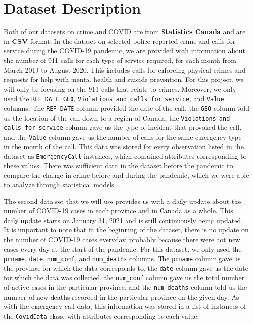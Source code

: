 \documentclass[fontsize=11pt]{article}
\begin{document}
\section{Dataset Description}
Both of our datasets on crime and COVID are from \textbf{Statistics Canada} and are in \textbf{CSV} format. In the dataset on selected police-reported crime and calls for service during the COVID-19 pandemic\cite{crime}, we are provided with information about the number of 911 calls for each type of service required, for each month from March 2019 to August 2020. This includes calls for enforcing physical crimes and requests for help with mental health and suicide prevention. For this project, we will only be focusing on the 911 calls that relate to  crimes. Moreover, we only used the \verb+REF_DATE+, \verb+GEO+, \verb+Violations and calls for service+, and \verb+Value+ columns. The \verb+REF_DATE+ column provided the date of the call, the \verb+GEO+ column told us the location of the call down to a region of Canada, the \verb+Violations and calls for service+ column gave us the type of incident that provoked the call, and the \verb+Value+ column gave us the number of calls for the same emergency type in the month of the call. This data was stored for every observation listed in the dataset as \verb+EmergencyCall+ instances, which contained attributes corresponding to these values. There was sufficient data in the dataset before the pandemic to compare the change in crime before and during the pandemic, which we were able to analyze through statistical models.

The second data set\cite{covid} that we will use provides us with a daily update about the number of COVID-19 cases in each province and in Canada as a whole. This daily update starts on January 31, 2021 and is still continuously being updated. It is important to note that in the beginning of the dataset, there is no update on the number of COVID-19 cases everyday, probably because there were not new cases every day at the start of the pandemic. For this dataset, we only used the \verb+prname+, \verb+date+, \verb+num_conf+, and \verb+num_deaths+ columns. The \verb+prname+ column gave us the province for which the data corresponds to, the \verb+date+ column gave us the date for which the data was collected, the \verb+num_conf+ column gave us the total number of active cases in the particular province, and the \verb+num_deaths+ column told us the number of new deaths recorded in the particular province on the given day. As with the emergency call data, this information was stored in a list of instances of the \verb+CovidData+ class, with attributes corresponding to each value.
\end{document}
